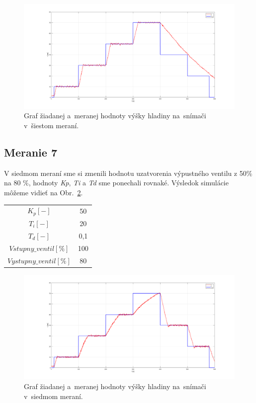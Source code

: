 \documentclass{article}
\begin{document}
\begin{figure}[!htbp]
	\begin{center}
		\includegraphics[width=\textwidth]{./include/meranie6.png}
	\end{center}
	\caption{Graf žiadanej a~meranej hodnoty výšky hladiny na~snímači v~šiestom meraní.}
	\label{fig:m6}
\end{figure}

\clearpage

\subsection{Meranie 7}
\label{sec:meranie7}

V siedmom meraní sme si zmenili hodnotu uzatvorenia výpustného ventilu z 50\% na 80 \%, hodnoty
\textit{Kp}, \textit{Ti} a \textit{Td} sme ponechali rovnaké. Výsledok simulácie môžeme vidieť na Obr.~\ref{fig:m7}.

\begin{center}
\begin{tabular}{ |c|c| }
 \hline
 $K_p [-]$ & 50 \\
 $T_i [-]$ & 20 \\
 $T_d [-]$ & 0,1 \\
 \hline
 $Vstupny\_ventil[\%]$ & 100 \\
 $Vystupny\_ventil[\%]$ & 80 \\
 \hline
\end{tabular}
\end{center}


\begin{figure}[!htbp]
	\begin{center}
		\includegraphics[width=\textwidth]{./include/meranie7.png}
	\end{center}
	\caption{Graf žiadanej a~meranej hodnoty výšky hladiny na~snímači v~siedmom meraní.}
	\label{fig:m7}
\end{figure}
\end{document}
